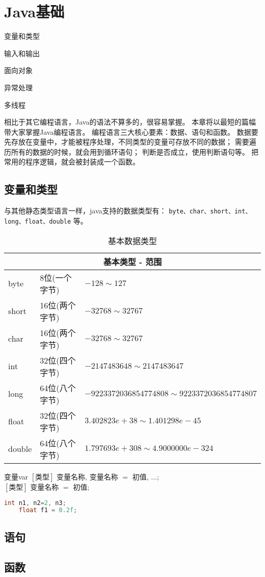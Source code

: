 \chapter{Java基础}

\begin{introduction}
	\item 变量和类型
	\item 输入和输出
	\item 面向对象
	\item 异常处理
	\item 多线程
\end{introduction}

相比于其它编程语言，Java的语法不算多的，很容易掌握。
本章将以最短的篇幅带大家掌握Java编程语言。
编程语言三大核心要素：数据、语句和函数。
数据要先存放在变量中，才能被程序处理，不同类型的变量可存放不同的数据；
需要遍历所有的数据的时候，就会用到循环语句；
判断是否成立，使用判断语句等。
把常用的程序逻辑，就会被封装成一个函数。

\section{变量和类型}
与其他静态类型语言一样，java支持的数据类型有：
\lstinline{byte、char、short、int、long、float、double}
等。

\begin{table}[!htbp] \centering \small
\begin{tabular}{|p{1cm}|p{3cm}|p{9cm}|}
\toprule
	\multicolumn{3}{|c|}{基本类型 - 范围}\\
\midrule
	byte&8位(一个字节)&$-128\sim127$\\
	short&16位(两个字节)&$-32768\sim32767$\\
	char&16位(两个字节)&$-32768\sim32767$\\
	int&32位(四个字节)&$-2147483648\sim2147483647$\\
	long&64位(八个字节)&$-9223372036854774808\sim9223372036854774807$\\
	float&32位(四个字节)&$3.402823e+38\sim1.401298e-45$\\
	double&64位(八个字节)&$1.797693e+308\sim4.9000000e-324$\\
\bottomrule
\end{tabular}
	\caption{基本数据类型}
\end{table}

\begin{definition}{变量}{var}
	$[\text{类型}]$ 变量名称, 变量名称 $=$ 初值, $\dots$;\\
	$[\text{类型}]$ 变量名称 $=$ 初值;
\end{definition}

\begin{lstlisting}[language=java]
	int n1, n2=2, n3;
	float f1 = 0.2f;
\end{lstlisting}


\section{语句}

\section{函数}